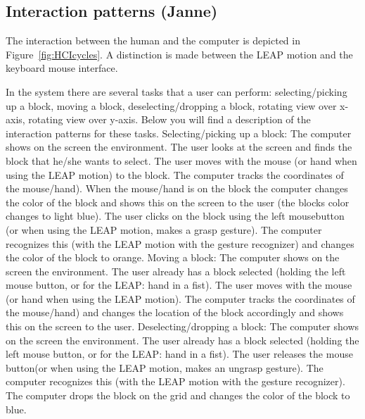 \subsection{Interaction patterns (Janne)}
The interaction between the human and the computer is depicted in Figure~\ref{fig:HCIcycles}. A distinction is made between the LEAP motion and the keyboard mouse interface. 

In the system there are several tasks that a user can perform: selecting/picking up a block, moving a block, deselecting/dropping a block, rotating view over x-axis, rotating view over y-axis. Below you will find a description of the interaction patterns for these tasks.
\newline\newline
Selecting/picking up a block: 
\newline The computer shows on the screen the environment. The user looks at the screen and finds the block that he/she wants to select. The user moves with the mouse (or hand when using the LEAP motion) to the block. The computer tracks the coordinates of the mouse/hand). When the mouse/hand is on the block the computer changes the color of the block and shows this on the screen to the user (the blocks color changes to light blue). The user clicks on the block using the left mousebutton (or when using the LEAP motion, makes a grasp gesture). The computer recognizes this (with the LEAP motion with the gesture recognizer) and changes the color of the block to orange.
\newline\newline
Moving a block: 
\newline The computer shows on the screen the environment. The user already has a block selected (holding the left mouse button, or for the LEAP: hand in a fist). The user moves with the mouse (or hand when using the LEAP motion). The computer tracks the coordinates of the mouse/hand) and changes the location of the block accordingly and shows this on the screen to the user. 
\newline\newline
Deselecting/dropping a block: 
\newline The computer shows on the screen the environment. The user already has a block selected (holding the left mouse button, or for the LEAP: hand in a fist). The user releases the mouse button(or when using the LEAP motion, makes an ungrasp gesture). The computer recognizes this (with the LEAP motion with the gesture recognizer). The computer drops the block on the grid and changes the color of the block to blue.
